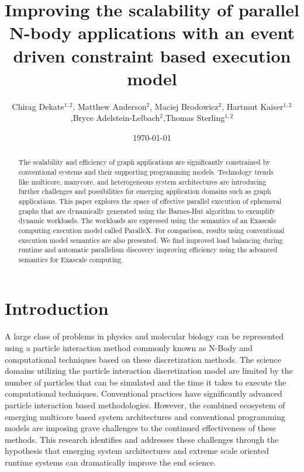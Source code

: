 \documentclass[floatfix]{revtex4}
\begin{document}
\title{Improving the scalability of parallel N-body applications with an event driven constraint based execution model}

\author{Chirag Dekate$^{1,2}$, Matthew Anderson$^{2}$, Maciej Brodowicz$^{2}$, Hartmut Kaiser$^{1,2}$,Bryce Adelstein-Lelbach$^{2}$,Thomas Sterling$^{1,2}$}



\date{\today}

\begin{abstract}
The scalability and efficiency of graph applications are significantly constrained
by conventional systems and their supporting programming models. Technology trends
like multicore, manycore, and heterogeneous system architectures are introducing
further challenges and possibilities for emerging application domains such as 
graph applications. This paper
explores the space of effective parallel execution of ephemeral graphs that are dynamically
generated using the Barnes-Hut algorithm to exemplify dynamic workloads. The workloads
are expressed using the semantics of an Exascale computing execution model called ParalleX. 
For comparison, results using conventional execution model semantics are also presented.
We find improved load balancing during runtime and automatic parallelism discovery
improving efficiency using the advanced semantics for Exascale computing. 
\end{abstract}

\maketitle

\section{Introduction}
A large class of problems in physics and molecular biology can be represented using a
particle interaction method commonly known as N-Body and computational techniques 
based on these discretization methods. The science domains utilizing the particle 
interaction discretization model are limited by the number of particles that can be 
simulated and the time it takes to execute the computational techniques. Conventional 
practices have significantly advanced particle interaction based methodologies. However, 
the combined ecosystem of emerging multicore based system architectures and conventional 
programming models are imposing grave challenges to the continued effectiveness of 
these methods. This research identifies and addresses these challenges through 
the hypothesis that emerging system architectures and extreme scale oriented 
runtime systems can dramatically improve the end science.
\end{document}
